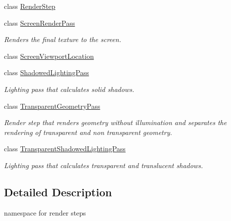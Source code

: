 \begin{DoxyCompactItemize}
class \mbox{\hyperlink{class_geometry_engine_1_1_geometry_render_step_1_1_render_step}{Render\+Step}}
\item 
class \mbox{\hyperlink{class_geometry_engine_1_1_geometry_render_step_1_1_screen_render_pass}{Screen\+Render\+Pass}}
\begin{DoxyCompactList}\small\item\em Renders the final texture to the screen. \end{DoxyCompactList}\item 
class \mbox{\hyperlink{class_geometry_engine_1_1_geometry_render_step_1_1_screen_viewport_location}{Screen\+Viewport\+Location}}
\item 
class \mbox{\hyperlink{class_geometry_engine_1_1_geometry_render_step_1_1_shadowed_lighting_pass}{Shadowed\+Lighting\+Pass}}
\begin{DoxyCompactList}\small\item\em Lighting pass that calculates solid shadows. \end{DoxyCompactList}\item 
class \mbox{\hyperlink{class_geometry_engine_1_1_geometry_render_step_1_1_transparent_geometry_pass}{Transparent\+Geometry\+Pass}}
\begin{DoxyCompactList}\small\item\em Render step that renders geometry without illumination and separates the rendering of transparent and non transparent geometry. \end{DoxyCompactList}\item 
class \mbox{\hyperlink{class_geometry_engine_1_1_geometry_render_step_1_1_transparent_shadowed_lighting_pass}{Transparent\+Shadowed\+Lighting\+Pass}}
\begin{DoxyCompactList}\small\item\em Lighting pass that calculates transparent and translucent shadows. \end{DoxyCompactList}\end{DoxyCompactItemize}


\subsection{Detailed Description}
namespace for render steps 